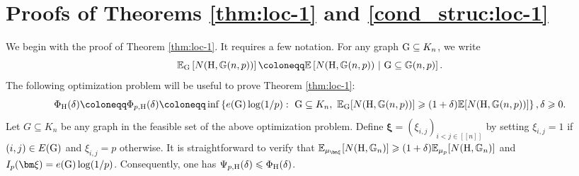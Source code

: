 \documentclass[a4paper,11pt,english,reqno]{amsart}
\numberwithin{equation}{section}
\renewcommand{\leq}{\leqslant}
\renewcommand{\geq}{\geqslant}
\newcommand{\E}{\mathbb{E}}
\newcommand{\uH}{\textup{H}}
\newcommand{\G}{\mathbb{G}}
\newcommand{\tu}[1]{\textup{#1}}
\newcommand{\set}[1]{[\![#1]\!]}
\newtheorem{remark}[theorem]{Remark}
\begin{document}
	
	
	
	
	
	
	
	
	
	
	
	\section{Proofs of Theorems \ref{thm:loc-1} and \ref{cond_struc:loc-1}}
	We begin with the proof of Theorem \ref{thm:loc-1}. It requires a few notation. For any graph $\tu{G}\subseteq K_{n}$, we write 
	\begin{equation*}
		\E_{\tu{G}}\left[N(\uH, \G(n,p))\right]\coloneqq \E\left[N(\uH, \G(n,p))\ |\ \tu{G}\subseteq \G(n,p)\right].
	\end{equation*}
	The following optimization problem will be useful to prove Theorem \ref{thm:loc-1}:
	\begin{equation*}
		\Phi_{\uH}(\delta) \coloneqq \Phi_{p,\uH}(\delta) \coloneqq \inf\left\{e(\textup{G})\log(1/p):\ \textup{G}\subseteq K_n,\ \E_{\textup{G}}[N(\uH, \G(n,p))] \geq (1+\delta)\E[N(\uH, \G(n,p))]\right\}, \delta \geq 0.
	\end{equation*}
	Let $G\subseteq K_n$  be any graph in the feasible set of the above optimization problem. Define ${\bm \xi} = (\xi_{i,j})_{i<j\in \set{n}}$ by setting $\xi_{i,j} = 1$ if $(i,j)\in E(\tu{G})$ and $\xi_{i,j}=p$ otherwise. It is straightforward to verify that $\E_{\mu_{\bm \xi}}[N(\uH, \G_n)]\geq (1+\delta)\E_{\mu_p}[N(\uH,\G_n)]$ and $I_p({\bm \xi}) = e(\tu{G})\log(1/p)$. Consequently, one has $\Psi_{p,\uH}(\delta)\leq \Phi_{\uH}(\delta)$. 
	
\end{document}
